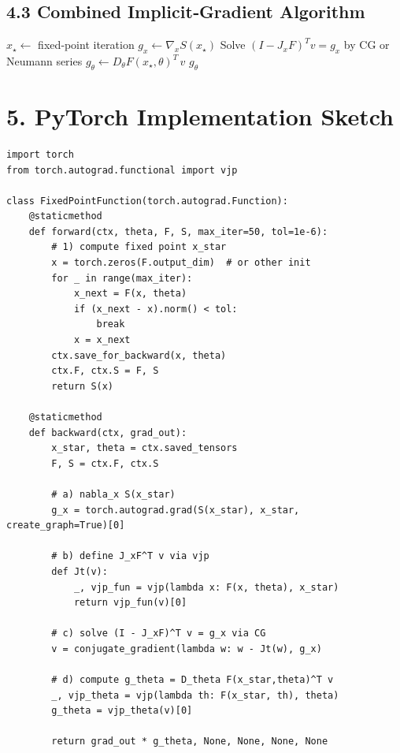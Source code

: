 \documentclass{article}
\begin{document}
\subsection*{4.3 Combined Implicit‐Gradient Algorithm}
\begin{algorithm}[H]
\caption{Compute \(\nabla_\theta S(\Pi(\theta))\)}
\begin{algorithmic}[1]
  \STATE \(x_\star \leftarrow\) fixed‐point iteration
  \STATE \(g_x \leftarrow \nabla_x S(x_\star)\)
  \STATE Solve \((I - J_xF)^{T}v = g_x\) by CG or Neumann series
  \STATE \(g_\theta \leftarrow D_\theta F(x_\star,\theta)^{T}\,v\)
  \RETURN \(g_\theta\)
\end{algorithmic}
\end{algorithm}

\section*{5. PyTorch Implementation Sketch}
\begin{verbatim}
import torch
from torch.autograd.functional import vjp

class FixedPointFunction(torch.autograd.Function):
    @staticmethod
    def forward(ctx, theta, F, S, max_iter=50, tol=1e-6):
        # 1) compute fixed point x_star
        x = torch.zeros(F.output_dim)  # or other init
        for _ in range(max_iter):
            x_next = F(x, theta)
            if (x_next - x).norm() < tol:
                break
            x = x_next
        ctx.save_for_backward(x, theta)
        ctx.F, ctx.S = F, S
        return S(x)

    @staticmethod
    def backward(ctx, grad_out):
        x_star, theta = ctx.saved_tensors
        F, S = ctx.F, ctx.S

        # a) nabla_x S(x_star)
        g_x = torch.autograd.grad(S(x_star), x_star, create_graph=True)[0]

        # b) define J_xF^T v via vjp
        def Jt(v):
            _, vjp_fun = vjp(lambda x: F(x, theta), x_star)
            return vjp_fun(v)[0]

        # c) solve (I - J_xF)^T v = g_x via CG
        v = conjugate_gradient(lambda w: w - Jt(w), g_x)

        # d) compute g_theta = D_theta F(x_star,theta)^T v
        _, vjp_theta = vjp(lambda th: F(x_star, th), theta)
        g_theta = vjp_theta(v)[0]

        return grad_out * g_theta, None, None, None, None
\end{verbatim}
\end{document}
